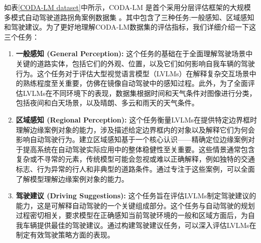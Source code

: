 \documentclass[
    linespread = 1.25
]{ctexart}
\begin{document}
如表\ref{CODA-LM dataset}中所示，CODA-LM 是首个采用分层评估框架的大规模多模式自动驾驶道路拐角案例数据集 \cite{chen2024automatedevaluationlargevisionlanguage}。其中包含了三种任务:一般感知、区域感知和驾驶建议。为了更好地理解CODA-LM数据集的评估指标，我们详细介绍一下这三个任务：

\begin{enumerate}
  \item \textbf{一般感知 (General Perception):}
        这个任务的基础在于全面理解驾驶场景中关键的道路实体，包括它们的外观、位置，以及它们如何影响自我车辆的驾驶行为。这个任务对于评估大型视觉语言模型（LVLMs）在解释复杂交互场景中的熟练程度至关重要，仿佛在镜像自动驾驶中的感知过程。此外，为了全面评估LVLMs在不同环境下的表现，数据集根据时间和天气条件对图像进行分类，包括夜间和白天场景，以及晴朗、多云和雨天的天气条件。

  \item \textbf{区域感知 (Regional Perception):}
        这个任务衡量LVLMs在提供特定边界框时理解边缘案例对象的能力，涉及描述给定边界框内的对象以及解释它们为何会影响自动驾驶行为。建立区域感知基于一个核心认识——精确定位边缘案例对于提高系统在自动驾驶实际应用中的整体稳健性至关重要。这些情景通常包含复杂或不寻常的元素，传统模型可能会忽视或难以正确解释，例如独特的交通标志、行为异常的行人和非典型的道路条件。通过专注于这些案例，可以全面了解模型理解边缘案例对象的能力。

  \item \textbf{驾驶建议 (Driving Suggestions):}
        这个任务旨在评估LVLMs制定驾驶建议的能力，这是可解释自动驾驶的一个关键组成部分。这个任务与自动驾驶的规划过程密切相关，要求模型在正确感知当前驾驶环境的一般和区域方面后，为自我车辆提供最佳的驾驶建议。通过构建驾驶建议任务，可以深入评估LVLMs在制定有效驾驶策略方面的表现。
\end{enumerate}
\end{document}
